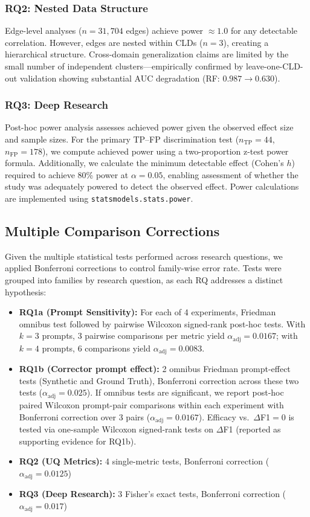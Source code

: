 \subsubsection{RQ2: Nested Data Structure}
Edge-level analyses ($n = 31{,}704$ edges) achieve power $\approx 1.0$ for any detectable correlation. However, edges are nested within CLDs ($n = 3$), creating a hierarchical structure. Cross-domain generalization claims are limited by the small number of independent clusters---empirically confirmed by leave-one-CLD-out validation showing substantial AUC degradation (RF: $0.987 \rightarrow 0.630$).

\subsubsection{RQ3: Deep Research}
Post-hoc power analysis assesses achieved power given the observed effect size and sample sizes. For the primary TP--FP discrimination test ($n_{\text{TP}}=44$, $n_{\text{FP}}=178$), we compute achieved power using a two-proportion z-test power formula. Additionally, we calculate the minimum detectable effect (Cohen's $h$) required to achieve 80\% power at $\alpha=0.05$, enabling assessment of whether the study was adequately powered to detect the observed effect. Power calculations are implemented using \texttt{statsmodels.stats.power}.

\subsection{Multiple Comparison Corrections}

Given the multiple statistical tests performed across research questions, we applied Bonferroni corrections to control family-wise error rate. Tests were grouped into families by research question, as each RQ addresses a distinct hypothesis:

\begin{itemize}[noitemsep]
    \item \textbf{RQ1a (Prompt Sensitivity):} For each of 4 experiments, Friedman omnibus test followed by pairwise Wilcoxon signed-rank post-hoc tests. With $k=3$ prompts, 3 pairwise comparisons per metric yield $\alpha_{\text{adj}} = 0.0167$; with $k=4$ prompts, 6 comparisons yield $\alpha_{\text{adj}} = 0.0083$.
    \item \textbf{RQ1b (Corrector prompt effect):} 2 omnibus Friedman prompt-effect tests (Synthetic and Ground Truth), Bonferroni correction across these two tests ($\alpha_{\text{adj}} = 0.025$). If omnibus tests are significant, we report post-hoc paired Wilcoxon prompt-pair comparisons within each experiment with Bonferroni correction over 3 pairs ($\alpha_{\text{adj}}=0.0167$). Efficacy vs.\ $\Delta$F1$=0$ is tested via one-sample Wilcoxon signed-rank tests on $\Delta$F1 (reported as supporting evidence for RQ1b).
    \item \textbf{RQ2 (UQ Metrics):} 4 single-metric tests, Bonferroni correction ($\alpha_{\text{adj}} = 0.0125$)
    \item \textbf{RQ3 (Deep Research):} 3 Fisher's exact tests, Bonferroni correction ($\alpha_{\text{adj}} = 0.017$)
\end{itemize}

